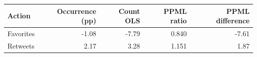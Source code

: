 \begin{tabular}{lrrrr}
\toprule
Action & Occurrence (pp) & Count OLS & PPML ratio & PPML difference \\
\midrule
Favorites & -1.08 & -7.79 & 0.840 & -7.61 \\
Retweets & 2.17 & 3.28 & 1.151 & 1.87 \\
\bottomrule
\end{tabular}
